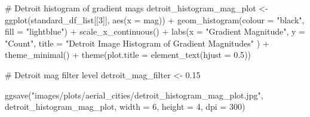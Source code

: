 \documentclass[
  letterpaper,
  DIV=11,
  numbers=noendperiod]{scrreprt}
\newenvironment{Shaded}{\begin{snugshade}}{\end{snugshade}}
\newcommand{\AttributeTok}[1]{\textcolor[rgb]{0.40,0.45,0.13}{#1}}
\newcommand{\CommentTok}[1]{\textcolor[rgb]{0.37,0.37,0.37}{#1}}
\newcommand{\DecValTok}[1]{\textcolor[rgb]{0.68,0.00,0.00}{#1}}
\newcommand{\FloatTok}[1]{\textcolor[rgb]{0.68,0.00,0.00}{#1}}
\newcommand{\FunctionTok}[1]{\textcolor[rgb]{0.28,0.35,0.67}{#1}}
\newcommand{\NormalTok}[1]{\textcolor[rgb]{0.00,0.23,0.31}{#1}}
\newcommand{\OtherTok}[1]{\textcolor[rgb]{0.00,0.23,0.31}{#1}}
\newcommand{\SpecialCharTok}[1]{\textcolor[rgb]{0.37,0.37,0.37}{#1}}
\newcommand{\StringTok}[1]{\textcolor[rgb]{0.13,0.47,0.30}{#1}}
\begin{document}
\begin{Shaded}
\begin{Highlighting}[]
\CommentTok{\# Detroit histogram of gradient mags}
\NormalTok{detroit\_histogram\_mag\_plot }\OtherTok{\textless{}{-}}
  \FunctionTok{ggplot}\NormalTok{(standard\_df\_list[[}\DecValTok{3}\NormalTok{]], }
         \FunctionTok{aes}\NormalTok{(}\AttributeTok{x =}\NormalTok{ mag)) }\SpecialCharTok{+}
  \FunctionTok{geom\_histogram}\NormalTok{(}\AttributeTok{colour =} \StringTok{"black"}\NormalTok{, }\AttributeTok{fill =} \StringTok{"lightblue"}\NormalTok{) }\SpecialCharTok{+}
  \FunctionTok{scale\_x\_continuous}\NormalTok{() }\SpecialCharTok{+} 
  \FunctionTok{labs}\NormalTok{(}\AttributeTok{x =} \StringTok{"Gradient Magnitude"}\NormalTok{, }
       \AttributeTok{y =} \StringTok{"Count"}\NormalTok{, }
       \AttributeTok{title =} \StringTok{"Detroit Image Histogram of Gradient Magnitudes"}
\NormalTok{       ) }\SpecialCharTok{+}
  \FunctionTok{theme\_minimal}\NormalTok{() }\SpecialCharTok{+}
  \FunctionTok{theme}\NormalTok{(}\AttributeTok{plot.title =} \FunctionTok{element\_text}\NormalTok{(}\AttributeTok{hjust =} \FloatTok{0.5}\NormalTok{))}

\CommentTok{\# Detroit mag filter level}
\NormalTok{detroit\_mag\_filter }\OtherTok{\textless{}{-}} \FloatTok{0.15}

\FunctionTok{ggsave}\NormalTok{(}\StringTok{"images/plots/aerial\_cities/detroit\_histogram\_mag\_plot.jpg"}\NormalTok{, detroit\_histogram\_mag\_plot, }\AttributeTok{width =} \DecValTok{6}\NormalTok{, }\AttributeTok{height =} \DecValTok{4}\NormalTok{, }\AttributeTok{dpi =} \DecValTok{300}\NormalTok{)}
\end{Highlighting}
\end{Shaded}
\end{document}
